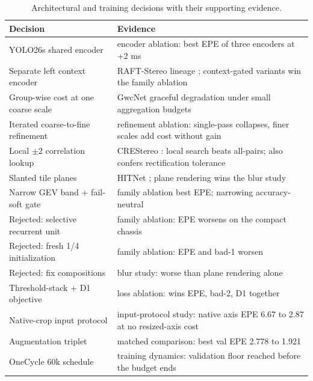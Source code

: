 \begin{table}[H]
\centering
\caption{Architectural and training decisions with their supporting evidence.}
\label{tab:design_evidence}
\small
\begin{tabular}{p{5.2cm}p{9.0cm}}
\toprule
Decision & Evidence\\
\midrule
YOLO26s shared encoder & encoder ablation: best EPE of three encoders at +2 ms\\
Separate left context encoder & RAFT-Stereo lineage \cite{lipson2021raftstereo}; context-gated variants win the family ablation\\
Group-wise cost at one coarse scale & GwcNet \cite{guo2019gwcnet} graceful degradation under small aggregation budgets\\
Iterated coarse-to-fine refinement & refinement ablation: single-pass collapses, finer scales add cost without gain\\
Local $\pm 2$ correlation lookup & CREStereo \cite{li2022crestereo}: local search beats all-pairs; also confers rectification tolerance\\
Slanted tile planes & HITNet \cite{tankovich2021hitnet}; plane rendering wins the blur study\\
Narrow GEV band + fail-soft gate & family ablation best EPE; narrowing accuracy-neutral\\
Rejected: selective recurrent unit & family ablation: EPE worsens on the compact chassis\\
Rejected: fresh 1/4 initialization & family ablation: EPE and bad-1 worsen\\
Rejected: fix compositions & blur study: worse than plane rendering alone\\
Threshold-stack + D1 objective & loss ablation: wins EPE, bad-2, D1 together\\
Native-crop input protocol & input-protocol study: native axis EPE 6.67 to 2.87 at no resized-axis cost\\
Augmentation triplet & matched comparison: best val EPE 2.778 to 1.921\\
OneCycle 60k schedule & training dynamics: validation floor reached before the budget ends\\
\bottomrule
\end{tabular}
\end{table}

\FloatBarrier
